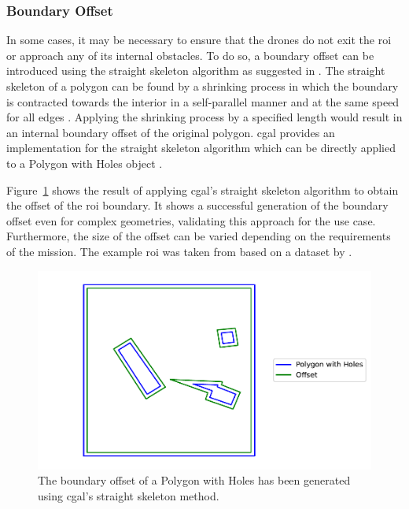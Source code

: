 
\subsubsection{Boundary Offset}

In some cases, it may be necessary to ensure that the drones do not exit the \gls{roi} or approach any of its internal obstacles. To do so, a boundary offset can be introduced using the straight skeleton algorithm as suggested in \cite{shahid2024cpp}. The straight skeleton of a polygon can be found by a shrinking process in which the boundary is contracted towards the interior in a self-parallel manner and at the same speed for all edges \cite{aichholzer1996ss}. Applying the shrinking process by a specified length would result in an internal boundary offset of the original polygon. \gls{cgal} provides an implementation for the straight skeleton algorithm which can be directly applied to a Polygon with Holes object \cite{cgal2024ss}.

Figure~\ref{fig:msp_straight_skeleton} shows the result of applying \gls{cgal}'s straight skeleton algorithm to obtain the offset of the \gls{roi} boundary. It shows a successful generation of the boundary offset even for complex geometries, validating this approach for the use case. Furthermore, the size of the offset can be varied depending on the requirements of the mission. The example \gls{roi} was taken from \cite{bahnemann2021cpp} based on a dataset by \cite{sun2014dataset}. 

\begin{figure}[h]
    \centering
    \includegraphics[width=0.7\linewidth]{figs/Jihwan/Polygon Offset with Straight Skeleton.pdf}
    \caption[Boundary Offset of \gls{roi} using Straight Skeleton]
    {The boundary offset of a Polygon with Holes has been generated using \gls{cgal}'s straight skeleton method.}
    \label{fig:msp_straight_skeleton}
\end{figure}

